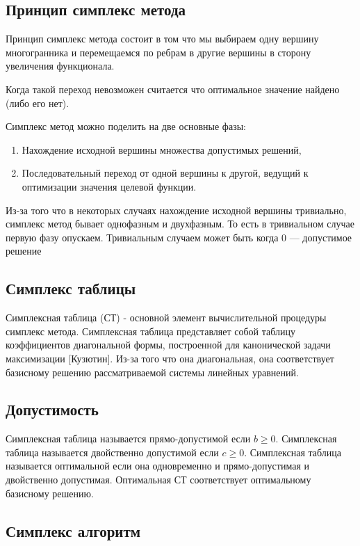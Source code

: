 \documentclass[a4paper,article,14pt]{extarticle}
\begin{document}
\subsection{Принцип симплекс метода}

Принцип симплекс метода состоит в том что мы выбираем одну вершину многогранника и перемещаемся по ребрам в другие вершины в сторону увеличения функционала.

Когда такой переход невозможен считается что оптимальное значение найдено (либо его нет).

Симплекс метод можно поделить на две основные фазы:

\begin{enumerate}
    \item Нахождение исходной вершины множества допустимых решений,
    \item Последовательный переход от одной вершины к другой, ведущий к оптимизации значения целевой функции.
\end{enumerate}

Из-за того что в некоторых случаях нахождение исходной вершины тривиально, симплекс метод бывает однофазным и двухфазным.
То есть в тривиальном случае первую фазу опускаем.
Тривиальным случаем может быть когда 0 --- допустимое решение

\subsection{Симплекс таблицы}

Симплексная таблица (СТ) - основной элемент вычислительной процедуры симплекс метода.
Симплексная таблица представляет собой таблицу коэффициентов диагональной формы, построенной для канонической задачи максимизации [Кузютин].
Из-за того что она диагональная, она соответствует базисному решению рассматриваемой системы линейных уравнений.

\subsection{Допустимость}

Симплексная таблица называется прямо-допустимой если \(b \ge 0\).
Симплексная таблица называется двойственно допустимой если \(c \ge 0\).
Симплексная таблица называется оптимальной если она одновременно и прямо-допустимая и двойственно допустимая.
Оптимальная СТ соответствует оптимальному базисному решению.

\subsection{Симплекс алгоритм}
\end{document}
